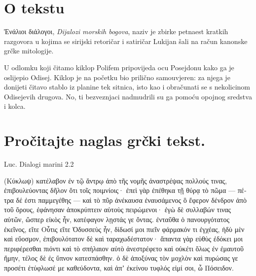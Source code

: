 


\section*{O tekstu}

Ἐνάλιοι διάλογοι, \textit{Dijalozi morskih bogova}, naziv je zbirke petnaest kratkih razgovora u kojima se sirijski retoričar i satiričar Lukijan šali na račun kanonske grčke mitologije.

U odlomku koji čitamo kiklop Polifem pripovijeda ocu Posejdonu kako ga je oslijepio Odisej. Kiklop je na početku bio prilično samouvjeren: za njega je donijeti čitavo stablo iz planine tek sitnica, isto kao i obračunati se s nekolicinom Odisejevih drugova. No, ti bezveznjaci nadmudrili su ga pomoću opojnog sredstva i kolca.



\section*{Pročitajte naglas grčki tekst.}

Luc. Dialogi marini 2.2


\medskip


{\large

\begin{greek}

\noindent (Κύκλωψ) κατέλαβον ἐν τῷ ἄντρῳ ἀπὸ τῆς νομῆς ἀναστρέψας πολλούς τινας, ἐπιβουλεύοντας δῆλον ὅτι τοῖς ποιμνίοις· ἐπεὶ γὰρ ἐπέθηκα τῇ θύρᾳ τὸ πῶμα — πέτρα δέ ἐστι παμμεγέθης — καὶ τὸ πῦρ ἀνέκαυσα ἐναυσάμενος ὃ ἔφερον δένδρον ἀπὸ τοῦ ὄρους, ἐφάνησαν ἀποκρύπτειν αὑτοὺς πειρώμενοι· ἐγὼ δὲ συλλαβών τινας αὐτῶν, ὥσπερ εἰκὸς ἦν, κατέφαγον λῃστάς γε ὄντας. ἐνταῦθα ὁ πανουργότατος ἐκεῖνος, εἴτε Οὖτις εἴτε Ὀδυσσεὺς ἦν, δίδωσί μοι πιεῖν φάρμακόν τι ἐγχέας, ἡδὺ μὲν καὶ εὔοσμον, ἐπιβουλότατον δὲ καὶ ταραχωδέστατον· ἅπαντα γὰρ εὐθὺς ἐδόκει μοι περιφέρεσθαι πιόντι καὶ τὸ σπήλαιον αὐτὸ ἀνεστρέφετο καὶ οὐκέτι ὅλως ἐν ἐμαυτοῦ ἤμην, τέλος δὲ ἐς ὕπνον κατεσπάσθην. ὁ δὲ ἀποξύνας τὸν μοχλὸν καὶ πυρώσας γε προσέτι ἐτύφλωσέ με καθεύδοντα, καὶ ἀπʼ ἐκείνου τυφλός εἰμί σοι, ὦ Πόσειδον.


\end{greek}

}


